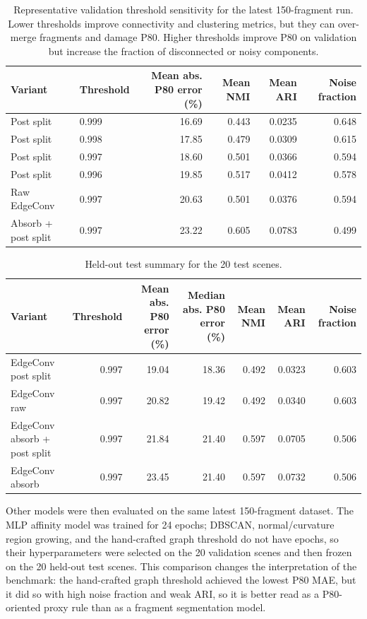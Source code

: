 \documentclass[11pt]{article}
\begin{document}
\begin{table}[t]
\centering
\small
\caption{Representative validation threshold sensitivity for the latest 150-fragment run. Lower thresholds improve connectivity and clustering metrics, but they can over-merge fragments and damage P80. Higher thresholds improve P80 on validation but increase the fraction of disconnected or noisy components.}
\label{tab:threshold-sweep}
\begin{tabular}{llrrrr}
\toprule
Variant & Threshold & Mean abs. P80 error (\%) & Mean NMI & Mean ARI & Noise fraction \\
\midrule
Post split & 0.999 & 16.69 & 0.443 & 0.0235 & 0.648 \\
Post split & 0.998 & 17.85 & 0.479 & 0.0309 & 0.615 \\
Post split & 0.997 & 18.60 & 0.501 & 0.0366 & 0.594 \\
Post split & 0.996 & 19.85 & 0.517 & 0.0412 & 0.578 \\
Raw EdgeConv & 0.997 & 20.63 & 0.501 & 0.0376 & 0.594 \\
Absorb + post split & 0.997 & 23.22 & 0.605 & 0.0783 & 0.499 \\
\bottomrule
\end{tabular}
\end{table}

\begin{table}[t]
\centering
\small
\caption{Held-out test summary for the 20 test scenes.}
\label{tab:test-summary}
\begin{tabular}{lrrrrrr}
\toprule
Variant & Threshold & Mean abs. P80 error (\%) & Median abs. P80 error (\%) & Mean NMI & Mean ARI & Noise fraction \\
\midrule
EdgeConv post split & 0.997 & 19.04 & 18.36 & 0.492 & 0.0323 & 0.603 \\
EdgeConv raw & 0.997 & 20.82 & 19.42 & 0.492 & 0.0340 & 0.603 \\
EdgeConv absorb + post split & 0.997 & 21.84 & 21.40 & 0.597 & 0.0705 & 0.506 \\
EdgeConv absorb & 0.997 & 23.45 & 21.40 & 0.597 & 0.0732 & 0.506 \\
\bottomrule
\end{tabular}
\end{table}

Other models were then evaluated on the same latest 150-fragment dataset. The MLP affinity model was trained for 24 epochs; DBSCAN, normal/curvature region growing, and the hand-crafted graph threshold do not have epochs, so their hyperparameters were selected on the 20 validation scenes and then frozen on the 20 held-out test scenes. This comparison changes the interpretation of the benchmark: the hand-crafted graph threshold achieved the lowest P80 MAE, but it did so with high noise fraction and weak ARI, so it is better read as a P80-oriented proxy rule than as a fragment segmentation model.
\end{document}
